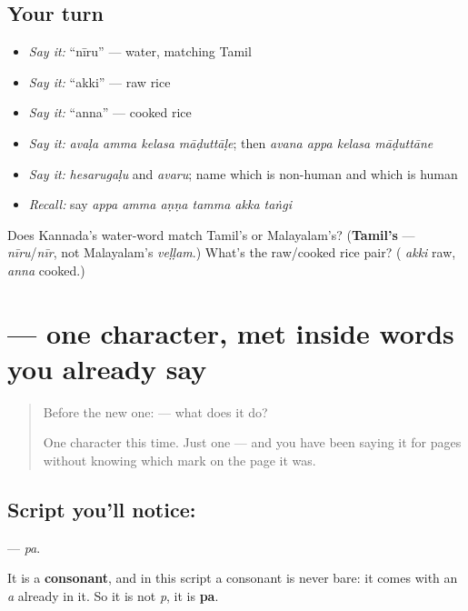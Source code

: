 \subsection*{Your turn}
\begin{itemize}
\raggedright
  \item \emph{Say it:} \textquotedblleft{}nīru\textquotedblright{} — water, matching Tamil
  \item \emph{Say it:} \textquotedblleft{}akki\textquotedblright{} — raw rice
  \item \emph{Say it:} \textquotedblleft{}anna\textquotedblright{} — cooked rice
  \item \emph{Say it:} \emph{avaḷa amma kelasa māḍuttāḷe}; then \emph{avana appa kelasa māḍuttāne}
  \item \emph{Say it:} \emph{hesarugaḷu} and \emph{avaru}; name which is non-human and which is human
  \item \emph{Recall:} say \emph{appa amma aṇṇa tamma akka taṅgi}
\end{itemize}

\begin{tcolorbox}[breakable,colback=teal!4,colframe=teal!35!black,title={Before you move on}]
Does Kannada's water-word match Tamil's or Malayalam's? (\textbf{Tamil's} — \emph{nīru}/\emph{nīr}, not Malayalam's \emph{veḷḷam}.) What's the raw/cooked rice pair? (\textbf{} \emph{akki} raw, \textbf{} \emph{anna} cooked.)
\end{tcolorbox}
\section[\texorpdfstring{\kn{ಪ} (pa)}{ಪ (pa)}]{ — one character, met inside words you already say}

\label{lesson:KA-S124-letter-pa}



\begin{quote}
Before the new one:  — what does it do?

One character this time. Just one — and you have been saying it for pages without knowing which mark on the page it was.
\end{quote}

\subsection*{Script you'll notice: }
\textbf{} — \emph{pa}.

It is a \textbf{consonant}, and in this script a consonant is never bare: it comes with an \emph{a} already in it. So it is not \emph{p}, it is \textbf{pa}.

